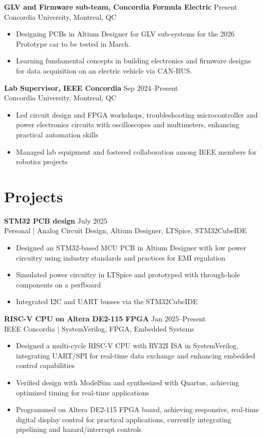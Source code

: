 \documentclass[10pt]{article}
\begin{document}
\textbf{GLV and Firmware sub-team, Concordia Formula Electric} \hfill Present\\
Concordia University, Montreal, QC
\begin{itemize}
    \item Designing PCBs in Altium Designer for GLV sub-systems for the 2026 Prototype car to be tested in March.
    \item Learning fundamental concepts in building electronics and firmware designs for data acquisition on an electric vehicle via CAN-BUS.
\end{itemize}

\textbf{Lab Supervisor, IEEE Concordia} \hfill Sep 2024--Present \\
Concordia University, Montreal, QC
\begin{itemize}
    \item Led circuit design and FPGA workshops, troubleshooting microcontroller and power electronics circuits with oscilloscopes and multimeters, enhancing practical automation skills
    \item Managed lab equipment and fostered collaboration among IEEE members for robotics projects
\end{itemize}

\section*{Projects}
\textbf{STM32 PCB design} \hfill July 2025 \\
Personal | Analog Circuit Design, Altium Designer, LTSpice, STM32CubeIDE
\begin{itemize}
    \item Designed an STM32-based MCU PCB in Altium Designer with low power circuitry using industry standards and practices for EMI regulation
    \item Simulated power circuitry in LTSpice and prototyped with through-hole components on a perfboard
    \item Integrated I2C and UART busses via the STM32CubeIDE
\end{itemize}

\textbf{RISC-V CPU on Altera DE2-115 FPGA} \hfill Jan 2025--Present \\
IEEE Concordia | SystemVerilog, FPGA, Embedded Systems
\begin{itemize}
    \item Designed a multi-cycle RISC-V CPU with RV32I ISA in SystemVerilog, integrating UART/SPI for real-time data exchange and enhancing embedded control capabilities
    \item Verified design with ModelSim and synthesized with Quartus, achieving optimized timing for real-time applications
    \item Programmed on Altera DE2-115 FPGA board, achieving responsive, real-time digital display control for practical
applications, currently integrating pipelining and hazard/interrupt controls
\end{itemize}
\end{document}
